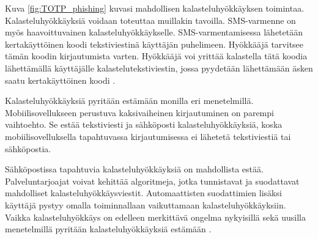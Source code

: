 Kuva \ref{fig:TOTP_phishing} kuvasi mahdollisen kalasteluhyökkäyksen toimintaa. Kalasteluhyökkäyksiä voidaan toteuttaa muillakin tavoilla. SMS-varmenne on myös haavoittuvainen kalasteluhyökkäykselle. SMS-varmentamisessa lähetetään kertakäyttöinen koodi tekstiviestinä käyttäjän puhelimeen. Hyökkääjä tarvitsee tämän koodin kirjautumista varten. Hyökkääjä voi yrittää kalastella tätä koodia lähettämällä käyttäjälle kalastelutekstiviestin, jossa pyydetään lähettämään äsken saatu kertakäyttöinen koodi \citep{google_transparency_report}.

Kalasteluhyökkäyksiä pyritään estämään monilla eri menetelmillä. Mobiilisovellukseen perustuva kaksivaiheinen kirjautuminen on parempi vaihtoehto. Se estää tekstiviesti ja sähköposti kalasteluhyökkäyksiä, koska mobiilisovelluksella tapahtuvassa kirjautumisessa ei lähetetä tekstiviestiä tai sähköpostia.

Sähköpostissa tapahtuvia kalasteluhyökkäyksiä on mahdollista estää. Palveluntarjoajat voivat kehittää algoritmeja, jotka tunnistavat ja suodattavat mahdolliset kalasteluhyökkäysviestit. Automaattisten suodattimien lisäksi käyttäjä pystyy omalla toiminnallaan vaikuttamaan kalasteluhyökkäyksiin. Vaikka kalasteluhyökkäys on edelleen merkittävä ongelma nykyisillä sekä uusilla menetelmillä pyritään kalasteluhyökkäyksiä estämään \citep{google_transparency_report}.




